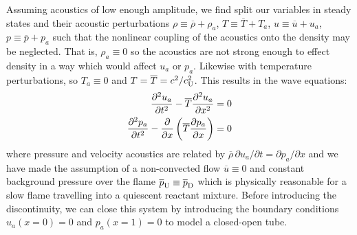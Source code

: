 Assuming acoustics of low enough amplitude, we find split our variables in steady states and their acoustic perturbations $ρ \equiv \overline{ρ} + ρ_a$, $T \equiv \overline{T} + T_a$, $u \equiv \overline{u} + u_a$, $p \equiv \overline{p} + p_a$ such that the nonlinear coupling of the acoustics onto the density may be neglected. That is, $ρ_a \equiv 0$ so the acoustics are not strong enough to effect density in a way which would affect $u_a$ or $p_a$. Likewise with temperature perturbations, so $T_a \equiv 0$ and $T = \oT = c^2 / c_{\rm{U}}^2$. This results in the wave equations:
\begin{subequations} \label{eqn:wave_eqn}
\begin{align} 
\pdv[2]{u_a}{t} - \oT \pdv[2]{u_a}{x} &= 0 \label{eqn:wave_eqn_u} \\
\pdv[2]{p_a}{t} - \pdv{x} \left( \oT \pdv{p_a}{x} \right) &= 0 \label{eqn:wave_eqn_p}
\end{align}
\end{subequations}
where pressure and velocity acoustics are related by $\overline{ρ} \, \partial u_a / \partial t = \partial p_a / \partial x$ and we have made the assumption of a non-convected flow $\overline{u} \equiv 0$ and constant background pressure over the flame $\overline{p}_{\rm{U}} \equiv \overline{p}_{\rm{D}}$ which is physically reasonable for a slow flame travelling into a quiescent reactant mixture. Before introducing the discontinuity, we can close this system by introducing the boundary conditions $u_a(x = 0) = 0$ and $p_a(x = 1) = 0$ to model a closed-open tube.

